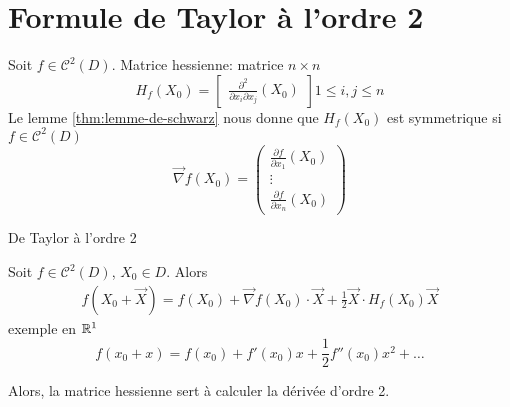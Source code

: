 \section{Formule de Taylor à l'ordre 2}
\begin{definition}
    Soit $f \in \mathcal{C}^2(D)$. Matrice hessienne: matrice  $n \times n$
    \[
    H_f(X_0) = \begin{bmatrix} \frac{\partial^2}{\partial x_i \partial x_j}(X_0) \end{bmatrix} 1\le i,j \le n
    \] 
    Le lemme \ref{thm:lemme-de-schwarz} nous donne que $H_f(X_0)$ est symmetrique si $f \in \mathcal{C}^2(D)$
    \[
        \vec{\nabla}f(X_0) = \begin{pmatrix} \frac{\partial f}{\partial x_1}(X_0) \\ \vdots \\ \frac{\partial f}{\partial x_n}(X_0) \end{pmatrix} 
    \] 
\end{definition}

\begin{theorem} De Taylor à l'ordre 2 \par
    Soit $f \in \mathcal{C}^2(D)$,  $X_0 \in D$. Alors  
    \begin{align*}
        f(X_0 + \vec{X}) = f(X_0) + \vec{\nabla }f(X_0) \cdot \vec{X} + \frac{1}{2}\vec{X} \cdot H_f(X_0)\vec{X}
    \end{align*}
    exemple en $\mathbb{R}^1$
    \[
    f(x_0 + x) = f(x_0) + f'(x_0)x + \frac{1}{2}f''(x_0)x^2 + \ldots
    \] 
\end{theorem}
\begin{intuition}
   Alors, la matrice hessienne sert à calculer la dérivée d'ordre 2. 
\end{intuition}

